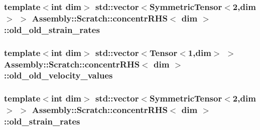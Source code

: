 \subsubsection[{old\+\_\+old\+\_\+strain\+\_\+rates}]{\setlength{\rightskip}{0pt plus 5cm}template$<$int dim$>$ std\+::vector$<$Symmetric\+Tensor$<$2,dim$>$ $>$ {\bf Assembly\+::\+Scratch\+::concentr\+R\+H\+S}$<$ dim $>$\+::old\+\_\+old\+\_\+strain\+\_\+rates}\label{struct_assembly_1_1_scratch_1_1concentr_r_h_s_ac722877b3d573cc39c3503a9b2607004}
\hypertarget{struct_assembly_1_1_scratch_1_1concentr_r_h_s_a7914c7c1d8f2232465ff96be67aecc93}{}
\subsubsection[{old\+\_\+old\+\_\+velocity\+\_\+values}]{\setlength{\rightskip}{0pt plus 5cm}template$<$int dim$>$ std\+::vector$<$Tensor$<$1,dim$>$ $>$ {\bf Assembly\+::\+Scratch\+::concentr\+R\+H\+S}$<$ dim $>$\+::old\+\_\+old\+\_\+velocity\+\_\+values}\label{struct_assembly_1_1_scratch_1_1concentr_r_h_s_a7914c7c1d8f2232465ff96be67aecc93}
\hypertarget{struct_assembly_1_1_scratch_1_1concentr_r_h_s_ac8bb5dab7eeb953de8020714bf306e0c}{}
\subsubsection[{old\+\_\+strain\+\_\+rates}]{\setlength{\rightskip}{0pt plus 5cm}template$<$int dim$>$ std\+::vector$<$Symmetric\+Tensor$<$2,dim$>$ $>$ {\bf Assembly\+::\+Scratch\+::concentr\+R\+H\+S}$<$ dim $>$\+::old\+\_\+strain\+\_\+rates}\label{struct_assembly_1_1_scratch_1_1concentr_r_h_s_ac8bb5dab7eeb953de8020714bf306e0c}
\hypertarget{struct_assembly_1_1_scratch_1_1concentr_r_h_s_a387df4b1d77c791fa36096d021da90b0}{}
